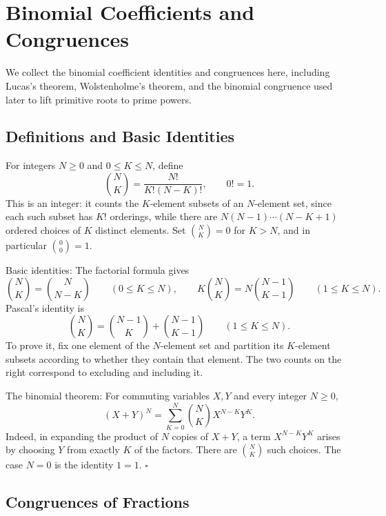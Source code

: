 \documentclass[a4paper,11pt,abstracton]{scrartcl}
\theoremstyle{dotlessP}
\theoremstyle{dotlessS}
\theoremstyle{remark}
\theoremstyle{definition}
\begin{document}
\section{Binomial Coefficients and Congruences}

We collect the binomial coefficient identities and congruences here,
including Lucas's theorem, Wolstenholme's theorem, and the binomial
congruence used later to lift primitive roots to prime powers.

\subsection{Definitions and Basic Identities}


\begin{definition_box}
For integers $N\geq0$ and $0\leq K\leq N$, define
\[
    \binom NK=\frac{N!}{K!(N-K)!},\qquad 0!=1.
\]
This is an integer: it counts the $K$-element subsets of an $N$-element
set, since each such subset has $K!$ orderings, while there are
$N(N-1)\cdots(N-K+1)$ ordered choices of $K$ distinct elements.
Set $\binom NK=0$ for $K>N$, and in particular $\binom00=1$.
\end{definition_box}


\begin{mainbox}{Basic identities:}
The factorial formula gives
\[
    \binom NK=\binom N{N-K}\qquad(0\leq K\leq N),
    \qquad
    K\binom NK=N\binom{N-1}{K-1}\qquad(1\leq K\leq N).
\]
Pascal's identity is
\[
    \binom NK=\binom{N-1}K+\binom{N-1}{K-1}
    \qquad(1\leq K\leq N).
\]
To prove it, fix one element of the $N$-element set and partition
its $K$-element subsets according to whether they contain that element.
The two counts on the right correspond to excluding and including it.
\end{mainbox}

\begin{mainbox}{The binomial theorem:}
For commuting variables $X,Y$ and every integer $N\geq0$,
\[
    (X+Y)^N=\sum_{K=0}^{N}\binom NK X^{N-K}Y^K.
\]
Indeed, in expanding the product of $N$ copies of $X+Y$, a term
$X^{N-K}Y^K$ arises by choosing $Y$ from exactly $K$ of the factors.
There are $\binom NK$ such choices. The case $N=0$ is the identity $1=1$.
\hfill$\square$
\end{mainbox}

\subsection{Congruences of Fractions}
\end{document}
